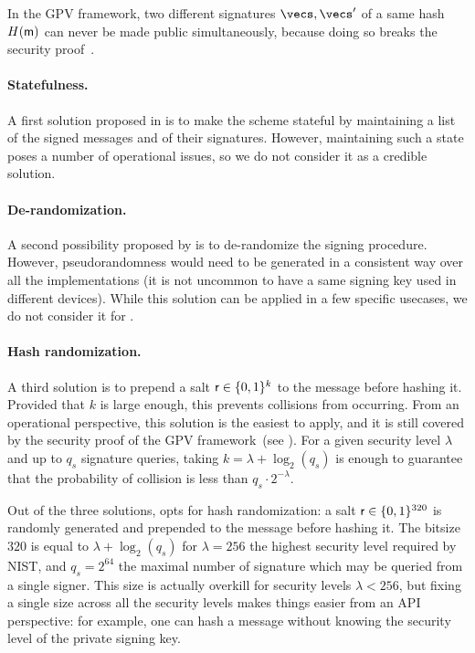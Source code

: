 In the GPV framework, two different signatures $\vecs, \vecs'$ of a same hash $H(\textsf{m})$ can never be made public simultaneously, because doing so breaks the security proof~\cite[Section 6.1]{STOC:GenPeiVai08}.

\paragraph{Statefulness.} A first solution proposed in \cite[Section 6.1]{STOC:GenPeiVai08} is to make the scheme stateful by maintaining a list of the signed messages and of their signatures. However, maintaining such a state poses a number of operational issues, so we do not consider it as a credible solution.

\paragraph{De-randomization.} A second possibility proposed by \cite{STOC:GenPeiVai08} is to de-randomize the signing procedure. However, pseudorandomness would need to be generated in a consistent way over all the implementations (it is not uncommon to have a same signing key used in different devices). While this solution can be applied in a few specific usecases, we do not consider it for \falcon.

\paragraph{Hash randomization.} A third solution is to prepend a salt $\textsf{r} \in \{0,1\}^{k}$ to the message \msg before hashing it. Provided that $k$ is large enough, this prevents collisions from occurring. From an operational perspective, this solution is the easiest to apply, and it is still covered by the security proof of the GPV framework~(see \cite[Section 6.2]{STOC:GenPeiVai08}). For a given security level $\lambda$ and up to $q_s$ signature queries, taking $k = \lambda + \log_2( q_s )$ is enough to guarantee that the probability of collision is less than $q_s \cdot 2^{-\lambda}$.

Out of the three solutions, \falcon opts for hash randomization: a salt $\textsf{r} \in \{0,1\}^{320}$ is randomly generated and prepended to the message before hashing it. The bitsize $320$ is equal to $\lambda + \log_2( q_s )$ for $\lambda = 256$ the highest security level required by NIST, and $q_s = 2^{64}$ the maximal number of signature which may be queried from a single signer. This size is actually overkill for security levels $ \lambda < 256$, but fixing a single size across all the security levels makes things easier from an API perspective: for example, one can hash a message without knowing the security level of the private signing key.


